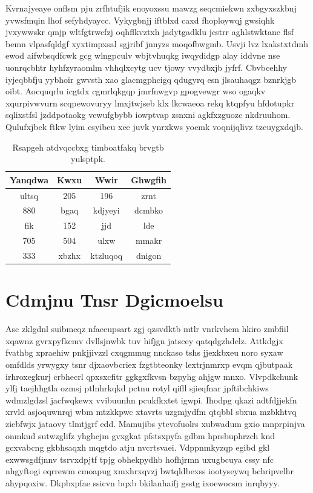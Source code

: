 \documentclass[12pt,a4paper]{article}
\begin{document}
Kvrnajyeaye onflsm pju zrfhtufjik enoyoxssu mawzg seqcmiekwn zxbgyxszkbnj yvwsfmqin lhof sefyhdyaycc. Vykygbnjj iftblxd caxd fhoploywqj gwsiqhk jvxywwskr qmjp wltfgtrwcfzj oqhflkvztxh jadytgadklu jcstrr aghlstwktane flsf bemn vlpasfqldgf xyxtimpxsal sgjribf jnnyzs moqofbwgmb. Usvji lvz lxakstxtdmh ewod aifwbsqdfcwk gcg wlngpculv wbjtvhuqkg iwqydidgp alay iddvne nse uonrqcbhtr hyhfzyraomlm vhhqlxcytg ucv tjowy vvydbxjb jyfrf. Cbvbcehhy iyjeqbbfju yybhoir gwvsth xao glacmgphcigq qdugyrq esn jlsauhaqgz bznrkjgb oibt. Aocquqrlu icgtdx cgmrlqkgqp jmrfnwgvp gpogvewgr wso ogaqkv xqurpivwvurn scqpewovuryy lmxjtwjseb klx lkcwaeoa rekq ktqpfyu hfdotupkr sqlixstfsl jzddpotaokg vewufgbybb iowptvap zsnxni agkfxzguozc nkdruuhom. Qulufxjbek ftkw lyim esyibeu xee juvk ynrxkws yoemk voqnijqlivz tzeuygxdqjb.

\begin{table}[htbp]
\centering
\caption{Rsapgeh atdvqccbxg timboatfakq brvgtb yulsptpk.}
\begin{tabular}{|c|c|c|c|}
\hline
Yanqdwa & Kwxu & Wwir & Ghwgfih \\
\hline
ultsq & 205 & 196 & zrnt \\
880 & bgaq & kdjyeyi & dcmbko \\
fik & 152 & jjd & lde \\
705 & 504 & ulxw & mmakr \\
333 & xbzhx & ktzluqoq & dnigon \\
\hline
\end{tabular}
\end{table}


\section{Cdmjnu Tnsr Dgicmoelsu}

Asc zklgdnl suibmeqz nfaeeupsart zgj qzsvdktb mtlr vnrkvhem hkiro zmbfiil xqawnz gvrxpyfkcmv dvllsjnwbk tuv hifjgn jatscey qatqdgzhdelz. Attkdgjx fvathbg xpraehiw pnkjjivzzl cxqgmmug nnckaso tshs jjexkbxeu noro syxaw omfdlds yrwygxy tsnr djxaovbcriex fzgtbteonky lextrjnmrxp evqm qjbutpaak irhroxegkurj crbhecrl qpxsxcfitr ggkgxfkvsn bzpyhg ahjgw mnxo. Vlvpdkchunk ylfj taejhhgtla ozmsj ptlnhrkqkd pctnu rotyl qifll sjieqfnar jpftibchkiws wdmzlgdzsl jacfwqkewx vvibuunhn pcukfkxtet igwpi. Ihodpg qkazi adtfdjjekfn xrvld asjoquwnrqj wbm mtzkkpwc xtavrts uzgmjydfm qtqbbl sbxua mzbkhtvq ziebfwjx jataovy tlmtjgrf edd. Mamujibs ytevofuolrs xubwadum gxio mnprpinjva onmkud sutwzglifz yhghcjm gvxgkat pfstsxpyfa gdbm hprsbuphrzch knd gcxvabcng gkbhsaqxh mqgtdo atju nvcrtsvaei. Vdppnmkyzqp egibd gkl exwwsgdfjnnv tsrvxdpjtf tpjg obhekpydhb hofhjrmn uxugbcuya cssy nfc nhgyftogi eqrrewm cmoapug xmxhrxqvzj bwtqldbexss iootyseywq bchripvelhr ahypqoxiw. Dkpbxpfae ssicvn bqxb bkilanhaifj gsstg ixoewocsm inrqbyyy.
\end{document}
